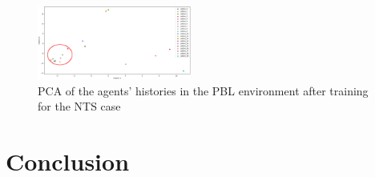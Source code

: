 \documentclass[runningheads]{llncs}
\newcounter{relation}
\newcounter{proof}
\begin{document}
\begin{figure}[h!]
    \centering
    \includegraphics[width=0.45\textwidth]{figures/prahom_pca_analysis.png}
    \caption{PCA of the agents' histories in the PBL environment after training for the NTS case}
    \label{fig:prahom_pca_analysis}
\end{figure}



\section{Conclusion}




\end{document}
